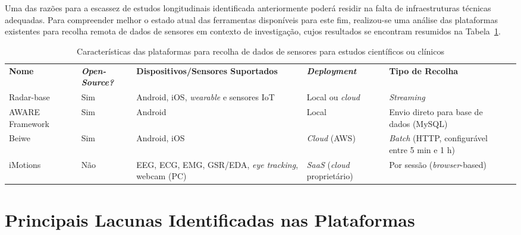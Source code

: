 Uma das razões para a escassez de estudos longitudinais identificada anteriormente poderá residir na falta de infraestruturas técnicas adequadas. Para compreender melhor o estado atual das ferramentas disponíveis para este fim, realizou-se uma análise das plataformas existentes para recolha remota de dados de sensores em contexto de investigação, cujos resultados se encontram resumidos na Tabela~\ref{tab:other_platforms}.
\begin{table}[H]    
    \centering
    \caption{Características das plataformas para recolha de dados de sensores para estudos científicos ou clínicos}
    \label{tab:other_platforms}
    \begin{tabular}{l|l|l|l|l|l}
        \toprule
        \textbf{Nome} & \textbf{\textit{Open-Source?}} & \textbf{Dispositivos/Sensores Suportados} & \textbf{\textit{Deployment}} & \textbf{Tipo de Recolha} \\ 
        Radar-base~\cite{radarbase} 
            & Sim 
            & Android, iOS, \textit{wearable} e sensores \ac{IoT} 
            & Local ou \textit{cloud} 
            & \textit{Streaming} \\

        AWARE Framework~\cite{aware} 
            & Sim 
            & Android 
            & Local 
            & Envio direto para base de dados (MySQL) \\

        Beiwe~\cite{beiwe_docs}
            & Sim
            & Android, iOS
            & \textit{Cloud} (AWS)
            & \textit{Batch} (HTTP, configurável entre 5 min e 1 h) \\

        iMotions~\cite{imotions_rdc}
            & Não
            & EEG, ECG, EMG, GSR/EDA, \textit{eye tracking}, webcam (PC)
            & \textit{SaaS} (\textit{cloud} proprietário)
            & Por sessão (\textit{browser}-based) \\
        \midrule
        \bottomrule
    \end{tabular}
\end{table}

\section{Principais Lacunas Identificadas nas Plataformas}

